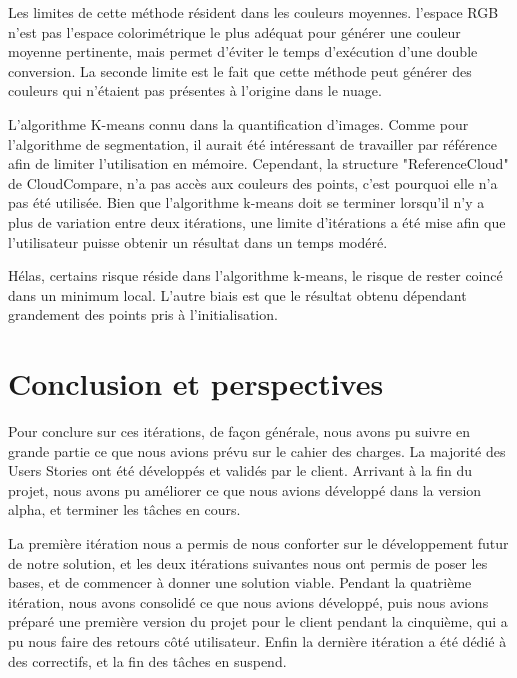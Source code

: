\documentclass[12pt,titlepage,french]{article}
\begin{document}
Les limites de cette méthode résident dans les couleurs moyennes.
l'espace RGB n'est pas l'espace colorimétrique le plus adéquat pour générer une couleur moyenne pertinente, mais permet d'éviter le temps d'exécution d'une double conversion.
La seconde limite est le fait que cette méthode peut générer des couleurs qui n'étaient pas présentes à l'origine dans le nuage.
\newline

L'algorithme K-means connu dans la quantification d'images.
Comme pour l'algorithme de segmentation, il aurait été intéressant de travailler par référence afin de limiter l'utilisation en mémoire.
Cependant, la structure "ReferenceCloud" de CloudCompare, n'a pas accès aux couleurs des points, c'est pourquoi elle n'a pas été utilisée.
Bien que l'algorithme k-means doit se terminer lorsqu'il n'y a plus de variation entre deux itérations, une limite d'itérations a été mise afin que l'utilisateur puisse obtenir un résultat dans un temps modéré.
\newline

Hélas, certains risque réside dans l'algorithme k-means, le risque de rester coincé dans un minimum local. L'autre biais est que le résultat obtenu dépendant grandement des points pris à l'initialisation.

\newpage
\section{Conclusion et perspectives}

Pour conclure sur ces itérations, de façon générale, nous avons pu suivre en grande partie ce que nous avions prévu sur le cahier des charges. La majorité des Users Stories ont été développés et validés par le client. Arrivant à la fin du projet, nous avons pu améliorer ce que nous avions développé dans la version alpha, et terminer les tâches en cours.\newline

La première itération nous a permis de nous conforter sur le développement futur de notre solution, et les deux itérations suivantes nous ont permis de poser les bases, et de commencer à donner une solution viable. Pendant la quatrième itération, nous avons consolidé ce que nous avions développé, puis nous avions préparé une première version du projet pour le client pendant la cinquième, qui a pu nous faire des retours côté utilisateur. Enfin la dernière itération a été dédié à des correctifs, et la fin des tâches en suspend. \newline
\end{document}
